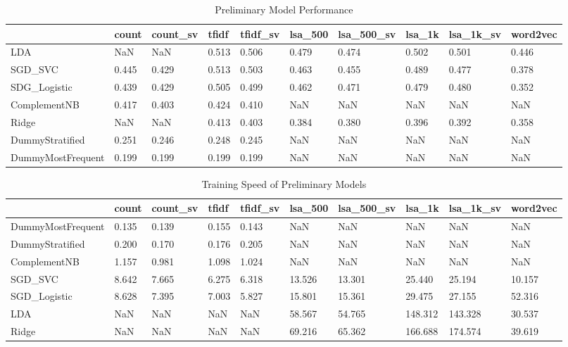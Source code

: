 \documentclass[compsoc]{IEEEtran}
\begin{document}
\begin{table}[htbp]

\centering
\caption{Preliminary Model Performance}
\label{table:preliminary-performance}
\begin{tabular}{llllllllll}
\toprule
                  & count    & count\_sv & tfidf    & tfidf\_sv & lsa\_500 & lsa\_500\_sv & lsa\_1k  & lsa\_1k\_sv & word2vec \\
\midrule
LDA               & NaN      & NaN       & 0.513 & 0.506  & 0.479 & 0.474     & 0.502 & 0.501    & 0.446 \\
SGD\_SVC          & 0.445 & 0.429  & 0.513 & 0.503  & 0.463 & 0.455     & 0.489 & 0.477    & 0.378 \\
SDG\_Logistic     & 0.439 & 0.429  & 0.505 & 0.499  & 0.462 & 0.471     & 0.479 & 0.480    & 0.352 \\
ComplementNB      & 0.417 & 0.403  & 0.424 & 0.410  & NaN      & NaN          & NaN      & NaN         & NaN      \\
Ridge             & NaN      & NaN       & 0.413 & 0.403  & 0.384 & 0.380     & 0.396 & 0.392    & 0.358 \\
DummyStratified   & 0.251 & 0.246  & 0.248 & 0.245  & NaN      & NaN          & NaN      & NaN         & NaN      \\
DummyMostFrequent & 0.199 & 0.199  & 0.199 & 0.199  & NaN      & NaN          & NaN      & NaN         & NaN    \\
\bottomrule
\end{tabular}
\end{table}

\begin{table}[htbp]

\centering
\caption{Training Speed of Preliminary Models}
\label{table:training-speed}
\begin{tabular}{llllllllll}
\toprule
                  & count    & count\_sv & tfidf    & tfidf\_sv & lsa\_500  & lsa\_500\_sv & lsa\_1k    & lsa\_1k\_sv & word2vec  \\
\midrule
DummyMostFrequent & 0.135 & 0.139  & 0.155 & 0.143  & NaN       & NaN          & NaN        & NaN         & NaN       \\
DummyStratified   & 0.200 & 0.170  & 0.176 & 0.205  & NaN       & NaN          & NaN        & NaN         & NaN       \\
ComplementNB      & 1.157 & 0.981  & 1.098 & 1.024  & NaN       & NaN          & NaN        & NaN         & NaN       \\
SGD\_SVC          & 8.642 & 7.665  & 6.275 & 6.318  & 13.526 & 13.301    & 25.440  & 25.194   & 10.157 \\
SGD\_Logistic     & 8.628 & 7.395  & 7.003 & 5.827  & 15.801 & 15.361    & 29.475  & 27.155   & 52.316 \\
LDA               & NaN      & NaN       & NaN      & NaN       & 58.567 & 54.765    & 148.312 & 143.328  & 30.537 \\
Ridge             & NaN      & NaN       & NaN      & NaN       & 69.216 & 65.362    & 166.688 & 174.574  & 39.619 \\
\bottomrule
\end{tabular}
\end{table}
\end{document}
